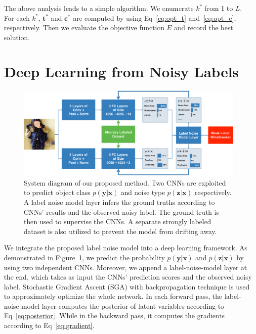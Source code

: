 \documentclass[10pt,twocolumn,letterpaper]{article}
\def\vec{\mathbf}
\begin{document}
The above analysis leads to a simple algorithm. We enumerate $k^*$ from 1 to $L$. For each $k^*$, $\vec{t}^*$ and $\vec{c}^*$ are computed by using Eq~\eqref{eq:opt_t} and~\eqref{eq:opt_c}, respectively. Then we evaluate the objective function $E$ and record the best solution.




\section{Deep Learning from Noisy Labels} %
\label{sec:weak_label_deep_learning}

\begin{figure}
\begin{center}
\includegraphics[width=0.9\linewidth]{figure/diagram.pdf}
\end{center}
\caption{System diagram of our proposed method. Two CNNs are exploited to predict object class $p(\vec{y}|\vec{x})$ and noise type $p(\vec{z}|\vec{x})$ respectively. A label noise model layer infers the ground truths according to CNNs' results and the observed noisy label. The ground truth is then used to supervise the CNNs. A separate strongly labeled dataset is also utilized to prevent the model from drifting away.}
\label{fig:framework}
\end{figure}

We integrate the proposed label noise model into a deep learning framework. As demonstrated in Figure~\ref{fig:framework}, we predict the probability $p(\vec{y}|\vec{x})$ and $p(\vec{z}|\vec{x})$ by using two independent CNNs. Moreover, we append a label-noise-model layer at the end, which takes as input the CNNs' prediction scores and the observed noisy label. Stochastic Gradient Ascent (SGA) with backpropagation technique is used to approximately optimize the whole network. In each forward pass, the label-noise-model layer computes the posterior of latent variables according to Eq~\eqref{eq:posterior}. While in the backward pass, it computes the gradients according to Eq~\eqref{eq:gradient}.
\end{document}
